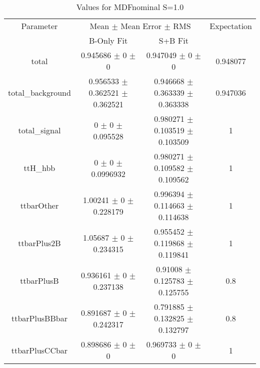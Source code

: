 \begin{table}
\centering
\caption{Values for MDFnominal S=1.0}
\begin{tabular}{cccc}
\toprule
Parameter & \multicolumn{2}{c}{Mean $\pm$ Mean Error $\pm$ RMS} & Expectation\\
 & B-Only Fit & S+B Fit & \\
\midrule
total & \num{0.945686} $\pm$ \num{0} $\pm$ \num{0} & \num{0.947049} $\pm$ \num{0} $\pm$ \num{0} & \num{0.948077}\\
total\_background & \num{0.956533} $\pm$ \num{0.362521} $\pm$ \num{0.362521} & \num{0.946668} $\pm$ \num{0.363339} $\pm$ \num{0.363338} & \num{0.947036}\\
total\_signal & \num{0} $\pm$ \num{0} $\pm$ \num{0.095528} & \num{0.980271} $\pm$ \num{0.103519} $\pm$ \num{0.103509} & \num{1}\\
ttH\_hbb & \num{0} $\pm$ \num{0} $\pm$ \num{0.0996932} & \num{0.980271} $\pm$ \num{0.109582} $\pm$ \num{0.109562} & \num{1}\\
ttbarOther & \num{1.00241} $\pm$ \num{0} $\pm$ \num{0.228179} & \num{0.996394} $\pm$ \num{0.114663} $\pm$ \num{0.114638} & \num{1}\\
ttbarPlus2B & \num{1.05687} $\pm$ \num{0} $\pm$ \num{0.234315} & \num{0.955452} $\pm$ \num{0.119868} $\pm$ \num{0.119841} & \num{1}\\
ttbarPlusB & \num{0.936161} $\pm$ \num{0} $\pm$ \num{0.237138} & \num{0.91008} $\pm$ \num{0.125783} $\pm$ \num{0.125755} & \num{0.8}\\
ttbarPlusBBbar & \num{0.891687} $\pm$ \num{0} $\pm$ \num{0.242317} & \num{0.791885} $\pm$ \num{0.132825} $\pm$ \num{0.132797} & \num{0.8}\\
ttbarPlusCCbar & \num{0.898686} $\pm$ \num{0} $\pm$ \num{0} & \num{0.969733} $\pm$ \num{0} $\pm$ \num{0} & \num{1}\\
\bottomrule
\end{tabular}
\end{table}
